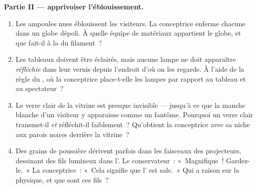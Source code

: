 \begin{problem}
\medskip\noindent\textbf{Partie II --- apprivoiser l'éblouissement.}
\begin{enumerate}[resume]
  \item Les ampoules nues éblouissent les visiteurs. La conceptrice
        enferme chacune dans un globe dépoli. À quelle équipe de
        matériaux appartient le globe, et que fait-il à la 
        du filament~?
  \item Les tableaux doivent être éclairés, mais aucune lampe ne
        doit apparaître \emph{réfléchie} dans leur vernis depuis
        l'endroit d'où on les regarde. À l'aide de la règle du
        , où la conceptrice place-t-elle les lampes par
        rapport au tableau et au spectateur~?
  \item Le verre clair de la vitrine est presque invisible ---
        jusqu'à ce que la manche blanche d'un visiteur y apparaisse
        comme un fantôme. Pourquoi un verre clair transmet-il
        \emph{et} réfléchit-il faiblement~? Qu'obtient la
        conceptrice avec sa niche aux parois noires derrière la
        vitrine~?
  \item Des grains de poussière dérivent parfois dans les faisceaux
        des projecteurs, dessinant des fils lumineux dans l'. Le
        conservateur~: «~Magnifique~! Gardez-le.~» La conceptrice~:
        «~Cela signifie que l' est sale.~» Qui a raison sur la
        physique, et que sont ces fils~?
\end{enumerate}


\end{problem}
